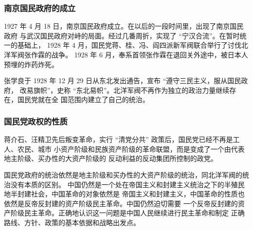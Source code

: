\documentclass[10pt, UTF8]{book} %
\begin{document}
\subsubsection{南京国民政府的成立}

1927 年 4 月 18 日，南京国民政府成立。在以后的一段时间里，出现了南京国民政府
与武汉国民政府对峙的局面。经过几番周折，实现了 “宁汉合流”。在暂时统一的基础上，
1928 年 4 月，国民党蒋、桂、冯、阎四派新军阀联合举行了讨伐北洋军阀张作霖的战争。
1928 年 6 月，奉系首领张作霖在退回关外途中，被日本人预埋的炸药炸死。

张学良于 1928 年 12 月 29 日从东北发出通告，宣布 “遵守三民主义，服从国民政府，
改易旗帜”，史称 “东北易帜”。北洋军阀不再作为独立的政治力量继续存在，国民党就在全
国范围内建立了自己的统治。

\subsubsection{国民党政权的性质}

蒋介石、汪精卫先后叛变革命，实行 “清党分共” 政策后，国民党已经不再是工人、农民、城市
小资产阶级和民族资产阶级的革命联盟，而是变成了一个由代表地主阶级、买办性的大资产阶级的
反动利益的反动集团所控制的政党。


国民党政府的统治依然是地主阶级和买办性的大资产阶级的统治，同北洋军阀的统治没有本质的区别。
中国仍然是一个处在帝国主义和封建主义统治之下的半殖民地半封建社会，中国革命的对象依然是
帝国主义和封建主义，中国革命的性质也依然是反帝反封建的资产阶级民主革命。中国仍然迫切需要
一个反帝反封建的资产阶级民主革命。正确地认识这一问题是中国人民继续进行民主革命和制定
正确路线、方针、政策的基本依据和战略出发点。
\end{document}
